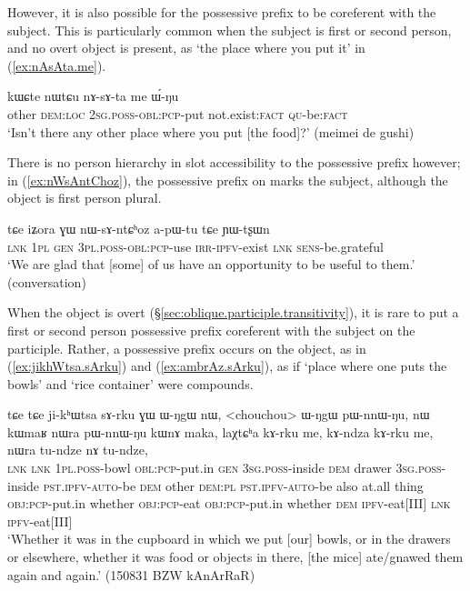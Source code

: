 However, it is also possible for the possessive prefix to be coreferent with the subject. This is particularly common when the subject is first or second person, and no overt object is present, as  `the place where you put it' in (\ref{ex:nAsAta.me}).
 
 \begin{exe}
\ex \label{ex:nAsAta.me}
\gll   kɯɕte nɯtɕu nɤ-sɤ-ta me ɯ́-ŋu \\
other \textsc{dem}:\textsc{loc} \textsc{2sg}.\textsc{poss}-\textsc{obl}:\textsc{pcp}-put not.exist:\textsc{fact} \textsc{qu}-be:\textsc{fact} \\
\glt `Isn't there any other place where you put [the food]?' (meimei de gushi)
 \end{exe} 

There is no person hierarchy in slot accessibility to the possessive prefix however; in (\ref{ex:nWsAntChoz}), the possessive prefix on  marks the subject, although the object is first person plural. 

 \begin{exe}
\ex \label{ex:nWsAntChoz}
\gll  tɕe iʑora ɣɯ nɯ-sɤ-ntɕʰoz a-pɯ-tu tɕe ɲɯ-tʂɯn \\
\textsc{lnk} \textsc{1pl} \textsc{gen} \textsc{3pl}.\textsc{poss}-\textsc{obl}:\textsc{pcp}-use \textsc{irr}-\textsc{ipfv}-exist \textsc{lnk} \textsc{sens}-be.grateful \\
\glt `We are glad that [some] of us have an opportunity to be useful to them.' (conversation)
 \end{exe}
   
When the object is overt (§\ref{sec:oblique.participle.transitivity}), it is rare to put a first or second person possessive prefix coreferent with the subject on the participle. Rather, a possessive prefix occurs on the object, as in (\ref{ex:jikhWtsa.sArku}) and (\ref{ex:ambrAz.sArku}), as if  `place where one puts the bowls' and  `rice container' were compounds.

\begin{exe}
\ex \label{ex:jikhWtsa.sArku}
\gll    tɕe tɕe ji-kʰɯtsa sɤ-rku ɣɯ ɯ-ŋgɯ nɯ, <chouchou> ɯ-ŋgɯ pɯ-nnɯ-ŋu, nɯ kɯmaʁ nɯra pɯ-nnɯ-ŋu kɯnɤ maka, laχtɕʰa kɤ-rku me, kɤ-ndza kɤ-rku me, nɯra tu-ndze nɤ tu-ndze, \\
\textsc{lnk} \textsc{lnk} \textsc{1pl}.\textsc{poss}-bowl \textsc{obl}:\textsc{pcp}-put.in \textsc{gen} \textsc{3sg}.\textsc{poss}-inside \textsc{dem} drawer \textsc{3sg}.\textsc{poss}-inside \textsc{pst}.\textsc{ipfv}-\textsc{auto}-be \textsc{dem} other \textsc{dem}:\textsc{pl} \textsc{pst}.\textsc{ipfv}-\textsc{auto}-be  also at.all thing \textsc{obj}:\textsc{pcp}-put.in whether \textsc{obj}:\textsc{pcp}-eat \textsc{obj}:\textsc{pcp}-put.in whether \textsc{dem} \textsc{ipfv}-eat[III] \textsc{lnk}  \textsc{ipfv}-eat[III] \\
\glt `Whether it was in the cupboard in which we put [our] bowls, or in the drawers or elsewhere, whether it was food or objects in there, [the mice] ate/gnawed them again and again.' (150831 BZW kAnArRaR)
\end{exe} 


